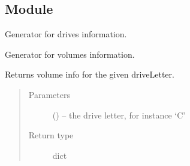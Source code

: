 \documentclass[letterpaper,10pt,english]{sphinxmanual}
\begin{document}
\subsection{Module }
\label{\detokenize{index:module-disktools}}\label{\detokenize{index:module-fsbackup.diskTools}}\label{\detokenize{index:module-diskTools}}

\begin{fulllineitems}
\label{\detokenize{index:fsbackup.diskTools.genDrivesInfo}}
Generator for drives information.

\end{fulllineitems}


\begin{fulllineitems}
\label{\detokenize{index:fsbackup.diskTools.genVolumesInfo}}
Generator for volumes information.

\end{fulllineitems}


\begin{fulllineitems}
\label{\detokenize{index:fsbackup.diskTools.getVolumeInfo}}
Returns volume info for the given driveLetter.
\begin{quote}\begin{description}
\item[{Parameters}] \leavevmode
{} () -- the drive letter, for instance `C'

\item[{Return type}] \leavevmode
dict

\end{description}\end{quote}

\end{fulllineitems}

\end{document}

